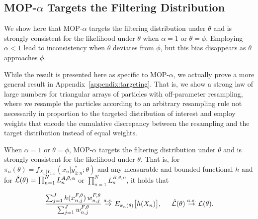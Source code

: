 \documentclass[11pt]{article}
\newcommand\arxiv[2]{#1} %
\begin{document}
\subsection{MOP-$\alpha$ Targets the Filtering Distribution}


We show here that MOP-$\alpha$ targets the filtering distribution under $\theta$ and is strongly consistent for the likelihood under $\theta$ when $\alpha=1$ or $\theta=\phi$.
Employing $\alpha<1$ lead to inconsistency when $\theta$ deviates from $\phi$, but this bias disappears as $\theta$ approaches $\phi$.

While the result is presented here as specific to MOP-$\alpha$, we actually prove a more general result in \arxiv{Appendix~\ref{appendix:targeting}}{the supplementary material}.
That is, we show a strong law of large numbers for triangular arrays of particles with off-parameter resampling, where we resample the particles according to an arbitrary resampling rule not necessarily in proportion to the targeted distribution of interest and employ weights that encode the cumulative discrepancy between the resampling and the target distribution instead of equal weights.


\begin{thm}
    \label{thm:mop-targeting}
    When $\alpha=1$ or $\theta=\phi$, MOP-$\alpha$ targets the filtering distribution under $\theta$ and is strongly consistent for the likelihood under $\theta$. That is, for $\pi_n(\theta)=f_{X_{n}|Y_{1:n}}(x_n|y_{1:n}^* ; \theta)$ and any measurable and bounded functional $h$ and for $\hat{\mathcal{L}}(\theta) = \prod_{n=1}^N L_n^{A,\theta,\alpha}$ or $\prod_{n=1}^N L_n^{B,\theta,\alpha}$, it holds that
    \arxiv{}{\vspace*{-2.5mm}}
    \begin{equation} \nonumber
        \frac{\sum_{j=1}^J h(x_{n,j}^{F, \theta}) \, w_{n,j}^{F,\theta}}{\sum_{j=1}^J w_{n,j}^{F,\theta}} \stackrel{a.s.}{\to} E_{\pi_n(\theta)} \big[h(X_n)\big], \hspace{5mm} \hat\lik(\theta)  \stackrel{a.s.}{\to} \lik(\theta).
    \arxiv{}{\vspace*{-2.5mm}}
    \end{equation}
\end{thm}
\end{document}
